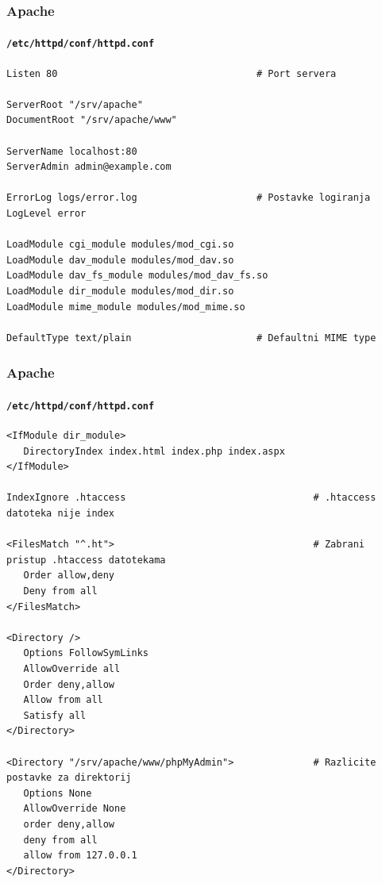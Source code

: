 \documentclass[t,table,usenames,dvipsnames]{beamer}
\begin{document}
\begin{frame}[fragile]
	\frametitle{Apache}
	\framesubtitle{\texttt{/etc/httpd/conf/httpd.conf}}
	\scriptsize
	\begin{verbatim}
Listen 80                                   # Port servera     

ServerRoot "/srv/apache"
DocumentRoot "/srv/apache/www"

ServerName localhost:80
ServerAdmin admin@example.com

ErrorLog logs/error.log                     # Postavke logiranja
LogLevel error

LoadModule cgi_module modules/mod_cgi.so
LoadModule dav_module modules/mod_dav.so
LoadModule dav_fs_module modules/mod_dav_fs.so
LoadModule dir_module modules/mod_dir.so
LoadModule mime_module modules/mod_mime.so

DefaultType text/plain                      # Defaultni MIME type
	\end{verbatim}

\end{frame}

\begin{frame}[fragile]
	\frametitle{Apache}
	\framesubtitle{\texttt{/etc/httpd/conf/httpd.conf}}
	\tiny
	\begin{verbatim}
<IfModule dir_module>
   DirectoryIndex index.html index.php index.aspx
</IfModule>

IndexIgnore .htaccess                                 # .htaccess datoteka nije index

<FilesMatch "^.ht">                                   # Zabrani pristup .htaccess datotekama
   Order allow,deny
   Deny from all
</FilesMatch>

<Directory />
   Options FollowSymLinks
   AllowOverride all
   Order deny,allow
   Allow from all
   Satisfy all
</Directory>

<Directory "/srv/apache/www/phpMyAdmin">              # Razlicite postavke za direktorij
   Options None
   AllowOverride None
   order deny,allow
   deny from all
   allow from 127.0.0.1
</Directory>
	\end{verbatim}

\end{frame}
\end{document}
